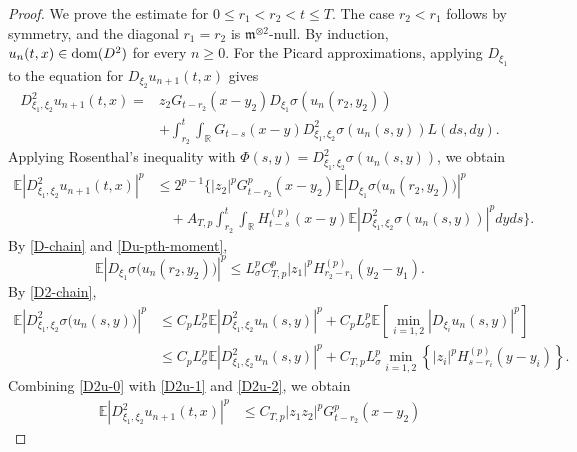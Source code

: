\documentclass[12pt]{article}
\def\bE{\mathbb{E}}
\def\bR{\mathbb{R}}
\newcommand{\fm}{\mathfrak{m}}
\begin{document}
\begin{proof}
We prove the estimate for $0\le r_1<r_2<t\le T$. The case
$r_2<r_1$ follows by symmetry, and the diagonal $r_1=r_2$ is
$\fm^{\otimes2}$-null. By induction, $u_n(t,x)\in{\rm dom}(D^2)$ for every
$n\ge0$.
For the Picard approximations, applying $D_{\xi_1}$ to the equation for
$D_{\xi_2}u_{n+1}(t,x)$ gives
\begin{align}
\label{D2u-picard-nonlinear}
D^2_{\xi_1,\xi_2}u_{n+1}(t,x)
=&
z_2G_{t-r_2}(x-y_2)
D_{\xi_1}\sigma(u_n(r_2,y_2))
\nonumber\\
&+
\int_{r_2}^t\int_{\bR}
G_{t-s}(x-y)
D^2_{\xi_1,\xi_2}\sigma(u_n(s,y))
L(ds,dy).
\end{align}
Applying Rosenthal's inequality with
$\Phi(s,y)=D^2_{\xi_1,\xi_2}\sigma(u_n(s,y))$, we obtain
\begin{equation}
    \label{D2u-0}
\begin{aligned}
 \bE\left|D^2_{\xi_1,\xi_2}u_{n+1}(t,x)\right|^p
&\le
2^{p-1}
\bigg\{
|z_2|^pG_{t-r_2}^p(x-y_2)
\bE\left|D_{\xi_1}\sigma\big(u_n(r_2,y_2)\big)\right|^p\\
&\quad+
A_{T,p}
\int_{r_2}^t\int_{\bR}
H_{t-s}^{(p)}(x-y)
\bE\left|
D^2_{\xi_1,\xi_2}\sigma(u_n(s,y))
\right|^p
dy ds
\bigg\}.
\end{aligned}
\end{equation}
By \eqref{D-chain} and 
 \eqref{Du-pth-moment},
\begin{equation}
    \label{D2u-1}
\bE\left|D_{\xi_1}\sigma\big(u_n(r_2,y_2)\big)\right|^p\le
L_\sigma^p C_{T,p}^p
|z_1|^p
H_{r_2-r_1}^{(p)}(y_2-y_1). 
\end{equation}
By \eqref{D2-chain},
\begin{equation}
\label{D2u-2}
\begin{aligned}
\bE\left|D^2_{\xi_1,\xi_2}\sigma\big(u_n(s,y)\big)\right|^p
&\le
C_pL_\sigma^p
\bE\left|D^2_{\xi_1,\xi_2}u_n(s,y)\right|^p
+
C_pL_\sigma^p
\bE\left[
\min_{i=1,2}
\left|D_{\xi_i}u_n(s,y)\right|^p
\right]  \\
&\le
C_pL_\sigma^p
\bE\left|D^2_{\xi_1,\xi_2}u_n(s,y)\right|^p
+
C_{T,p}L_\sigma^p
\min_{i=1,2}
\left\{
|z_i|^pH_{s-r_i}^{(p)}(y-y_i)
\right\}.
\end{aligned}
\end{equation}
Combining \eqref{D2u-0} with \eqref{D2u-1} and \eqref{D2u-2}, we obtain
\begin{equation}
\label{D2-renewal-nonlinear}
\begin{aligned}
\bE\left|D^2_{\xi_1,\xi_2}u_{n+1}(t,x)\right|^p
&\le
C_{T,p}|z_1z_2|^p
G_{t-r_2}^p(x-y_2)

\end{aligned}
\end{equation}
\end{proof}
\end{document}

